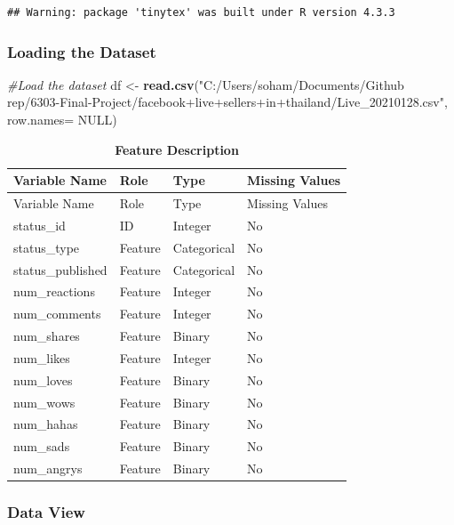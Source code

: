 \documentclass[
]{article}
\newenvironment{Shaded}{\begin{snugshade}}{\end{snugshade}}
\newcommand{\AttributeTok}[1]{\textcolor[rgb]{0.13,0.29,0.53}{#1}}
\newcommand{\CommentTok}[1]{\textcolor[rgb]{0.56,0.35,0.01}{\textit{#1}}}
\newcommand{\ConstantTok}[1]{\textcolor[rgb]{0.56,0.35,0.01}{#1}}
\newcommand{\FunctionTok}[1]{\textcolor[rgb]{0.13,0.29,0.53}{\textbf{#1}}}
\newcommand{\NormalTok}[1]{#1}
\newcommand{\OtherTok}[1]{\textcolor[rgb]{0.56,0.35,0.01}{#1}}
\newcommand{\StringTok}[1]{\textcolor[rgb]{0.31,0.60,0.02}{#1}}
\begin{document}
\begin{verbatim}
## Warning: package 'tinytex' was built under R version 4.3.3
\end{verbatim}

\subsubsection{Loading the Dataset}\label{loading-the-dataset}

\begin{Shaded}
\begin{Highlighting}[]
\CommentTok{\#Load the dataset}
\NormalTok{df }\OtherTok{\textless{}{-}} \FunctionTok{read.csv}\NormalTok{(}\StringTok{"C:/Users/soham/Documents/Github rep/6303{-}Final{-}Project/facebook+live+sellers+in+thailand/Live\_20210128.csv"}\NormalTok{, }\AttributeTok{row.names=} \ConstantTok{NULL}\NormalTok{)}
\end{Highlighting}
\end{Shaded}

\begin{longtable}[]{@{}llll@{}}
\caption{\textbf{Feature Description}}\tabularnewline
\toprule\noalign{}
Variable Name & Role & Type & Missing Values \\
\midrule\noalign{}
\endfirsthead
\toprule\noalign{}
Variable Name & Role & Type & Missing Values \\
\midrule\noalign{}
\endhead
\bottomrule\noalign{}
\endlastfoot
status\_id & ID & Integer & No \\
status\_type & Feature & Categorical & No \\
status\_published & Feature & Categorical & No \\
num\_reactions & Feature & Integer & No \\
num\_comments & Feature & Integer & No \\
num\_shares & Feature & Binary & No \\
num\_likes & Feature & Integer & No \\
num\_loves & Feature & Binary & No \\
num\_wows & Feature & Binary & No \\
num\_hahas & Feature & Binary & No \\
num\_sads & Feature & Binary & No \\
num\_angrys & Feature & Binary & No \\
\end{longtable}

\subsubsection{Data View}\label{data-view}
\end{document}
